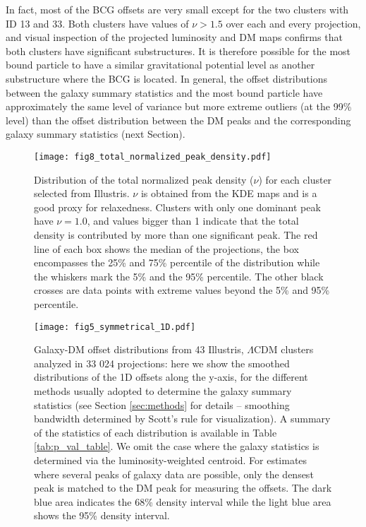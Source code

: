 \documentclass[usenatbib]{mn2e}
\begin{document}
{In fact, most of the BCG offsets are very small except for the two clusters with ID 13
and 33. Both clusters have  values of $\nu > 1.5 $ over each and every projection, and visual inspection of the projected luminosity and DM maps confirms that
both clusters have significant substructures. It is therefore possible for the
most bound particle to have a similar gravitational potential level as another 
substructure where the BCG is located. 
In general, the offset distributions between the galaxy summary statistics and
the most bound particle have approximately the same level of variance but more
extreme outliers (at the 99\% level) than the
offset distribution between the DM peaks and the corresponding galaxy summary
statistics (next Section).

\begin{figure}
\begin{center}
	\texttt{[image: fig8\_total\_normalized\_peak\_density.pdf]}
	\caption{Distribution of the total normalized peak density ($\nu$)
		for each cluster selected from Illustris. $\nu$ is obtained from the KDE maps and is a good proxy for relaxedness. Clusters with only one dominant peak have $\nu = 1.0$, and
		values bigger than 1 indicate that the total density is contributed by more than one significant peak. The red line of each box shows the median of the projections,
		the box encompasses the 25\% and 75\% percentile of the distribution while
		the whiskers mark the 5\% and the 95\% percentile. The other black crosses
		are data points with extreme values beyond the 5\% and 95\% percentile.
		\label{fig:nu_distribution} 
	}
\end{center}	
\end{figure}

\begin{figure*}
	\centering
	\texttt{[image: fig5\_symmetrical\_1D.pdf]}
	\caption{Galaxy-DM offset distributions from 43 Illustris, $\Lambda$CDM  clusters analyzed in 33 024 projections: here we show the smoothed distributions of the 1D offsets along the y-axis, for the different methods usually adopted to determine the galaxy summary statistics (see Section \ref{sec:methods} for details -- smoothing bandwidth determined by Scott's rule \citep{Scott2010} for visualization). A summary of the statistics of each distribution is available in Table \ref{tab:p_val_table}. We omit the case where the galaxy statistics is determined via the luminosity-weighted centroid.
	For estimates where several peaks of galaxy data are 
	possible, only the densest peak is matched to the DM peak for measuring
	the offsets. The dark blue area indicates the 68\% density interval
	while the light blue area shows the 95\% density interval. 
		\label{fig:offset_distributions}}
\end{figure*}
}
\end{document}
